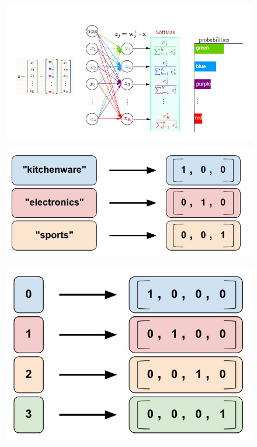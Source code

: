 \documentclass[10pt, compress]{beamer}
\begin{document}
\begin{frame}
  \vspace{.5cm}
  \begin{figure}
    \includegraphics[width=.8\linewidth]{imgs/softmax_2}
  \end{figure}

  \begin{multicols}{2}
    \begin{figure}
      \includegraphics[width=.9\linewidth]{imgs/categorical_1}
    \end{figure}
  \columnbreak
    \begin{figure}
      \includegraphics[width=.75\linewidth]{imgs/categorical_2}
    \end{figure}

  \end{multicols}

\end{frame}
\end{document}
